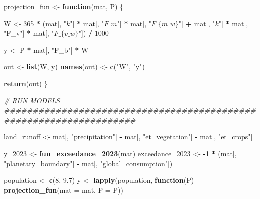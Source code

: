 \documentclass[
  11pt,
]{article}
\newenvironment{Shaded}{\begin{snugshade}}{\end{snugshade}}
\newcommand{\AttributeTok}[1]{\textcolor[rgb]{0.13,0.29,0.53}{#1}}
\newcommand{\CommentTok}[1]{\textcolor[rgb]{0.56,0.35,0.01}{\textit{#1}}}
\newcommand{\ControlFlowTok}[1]{\textcolor[rgb]{0.13,0.29,0.53}{\textbf{#1}}}
\newcommand{\DecValTok}[1]{\textcolor[rgb]{0.00,0.00,0.81}{#1}}
\newcommand{\FloatTok}[1]{\textcolor[rgb]{0.00,0.00,0.81}{#1}}
\newcommand{\FunctionTok}[1]{\textcolor[rgb]{0.13,0.29,0.53}{\textbf{#1}}}
\newcommand{\NormalTok}[1]{#1}
\newcommand{\OtherTok}[1]{\textcolor[rgb]{0.56,0.35,0.01}{#1}}
\newcommand{\SpecialCharTok}[1]{\textcolor[rgb]{0.81,0.36,0.00}{\textbf{#1}}}
\newcommand{\StringTok}[1]{\textcolor[rgb]{0.31,0.60,0.02}{#1}}
\begin{document}
\begin{Shaded}
\begin{Highlighting}[]
\NormalTok{projection\_fun }\OtherTok{\textless{}{-}} \ControlFlowTok{function}\NormalTok{(mat, P) \{}
  
\NormalTok{  W }\OtherTok{\textless{}{-}} \DecValTok{365} \SpecialCharTok{*}\NormalTok{ (mat[, }\StringTok{"$k$"}\NormalTok{] }\SpecialCharTok{*}\NormalTok{ mat[, }\StringTok{"$F\_m$"}\NormalTok{] }\SpecialCharTok{*}\NormalTok{ mat[, }\StringTok{"$F\_\{m\_w\}$"}\NormalTok{] }\SpecialCharTok{+} 
\NormalTok{                mat[, }\StringTok{"$k$"}\NormalTok{] }\SpecialCharTok{*}\NormalTok{ mat[, }\StringTok{"F\_v"}\NormalTok{] }\SpecialCharTok{*}\NormalTok{ mat[, }\StringTok{"$F\_\{v\_w\}$"}\NormalTok{]) }\SpecialCharTok{/} \DecValTok{1000}
  
\NormalTok{  y }\OtherTok{\textless{}{-}}\NormalTok{ P }\SpecialCharTok{*}\NormalTok{ mat[, }\StringTok{"F\_b"}\NormalTok{] }\SpecialCharTok{*}\NormalTok{ W}
  
\NormalTok{  out }\OtherTok{\textless{}{-}} \FunctionTok{list}\NormalTok{(W, y)}
  \FunctionTok{names}\NormalTok{(out) }\OtherTok{\textless{}{-}} \FunctionTok{c}\NormalTok{(}\StringTok{"W"}\NormalTok{, }\StringTok{"y"}\NormalTok{)}
  
  \FunctionTok{return}\NormalTok{(out)}
\NormalTok{\}}

\CommentTok{\# RUN MODELS \#\#\#\#\#\#\#\#\#\#\#\#\#\#\#\#\#\#\#\#\#\#\#\#\#\#\#\#\#\#\#\#\#\#\#\#\#\#\#\#\#\#\#\#\#\#\#\#\#\#\#\#\#\#\#\#\#\#\#\#\#\#\#\#\#\#\#}

\NormalTok{land\_runoff }\OtherTok{\textless{}{-}}\NormalTok{ mat[, }\StringTok{"precipitation"}\NormalTok{] }\SpecialCharTok{{-}}\NormalTok{ mat[, }\StringTok{"et\_vegetation"}\NormalTok{] }\SpecialCharTok{{-}}\NormalTok{ mat[, }\StringTok{"et\_crops"}\NormalTok{]}

\NormalTok{y\_2023 }\OtherTok{\textless{}{-}} \FunctionTok{fun\_exceedance\_2023}\NormalTok{(mat)}
\NormalTok{exceedance\_2023 }\OtherTok{\textless{}{-}}  \SpecialCharTok{{-}}\DecValTok{1} \SpecialCharTok{*}\NormalTok{ (mat[, }\StringTok{"planetary\_boundary"}\NormalTok{] }\SpecialCharTok{{-}}\NormalTok{ mat[, }\StringTok{"global\_consumption"}\NormalTok{])}

\NormalTok{population }\OtherTok{\textless{}{-}} \FunctionTok{c}\NormalTok{(}\DecValTok{8}\NormalTok{, }\FloatTok{9.7}\NormalTok{)}
\NormalTok{y }\OtherTok{\textless{}{-}} \FunctionTok{lapply}\NormalTok{(population, }\ControlFlowTok{function}\NormalTok{(P) }\FunctionTok{projection\_fun}\NormalTok{(}\AttributeTok{mat =}\NormalTok{ mat, }\AttributeTok{P =}\NormalTok{ P))}


\end{Highlighting}
\end{Shaded}
\end{document}
